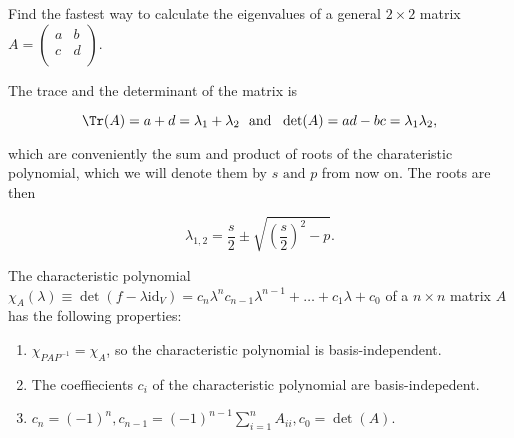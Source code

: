 \documentclass[a4paper,12pt]{report}
\begin{document}
{Find the fastest way to calculate the eigenvalues of a general \(2 \times 2\) matrix \(A = \begin{pmatrix}
    a &  b \\
    c &  d \\
\end{pmatrix}.\) }
{The trace and the determinant of the matrix is 

\begin{equation}
    \Tr (A) = a+d = \lambda _{1}+\lambda _{2} ~\text { and }~ \det (A) = ad - bc  = \lambda _{1}\lambda _{2},  
\end{equation}

which are conveniently the sum and product of roots of the charateristic polynomial, which we will denote them by \(s \text { and } p\) from now on. The roots are then 

\begin{equation}
    \lambda _{1,2} = \frac{s}{2} \pm \sqrt{\left( \frac{s}{2}  \right)^2 - p }.   
\end{equation}
} 

\begin{lemma}
The characteristic polynomial \(\chi _{A}(\lambda ) \equiv \det (f-\lambda \mathrm{id}_{V} ) = c_{n}\lambda ^{n} c_{n-1}\lambda ^{n-1} + \ldots + c_1 \lambda +c_0 \) of a \(n \times n\) matrix \(A\) has the following properties:

\begin{enumerate}[label=(\(O\)\arabic*)]
    \item \(\chi _{PAP^{-1} } = \chi _{A}  \), so the characteristic polynomial is basis-independent. \label{O1} 
    \item The coeffiecients \(c_{i} \) of the characteristic polynomial are basis-indepedent.
    \item \(c_{n} = (-1)^{n}, c_{n-1} = (-1)^{n-1}\sum_{i=1}^{n} A_{ii}, c_0 = \det (A)\).    
\end{enumerate}

\end{lemma}

\end{document}
